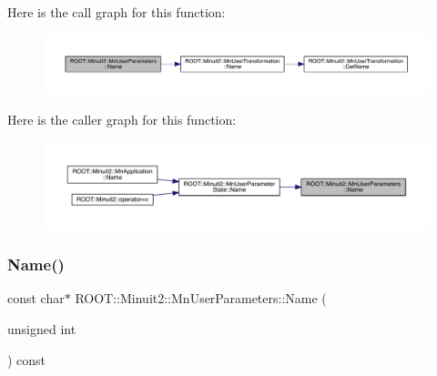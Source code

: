 Here is the call graph for this function\+:\nopagebreak
\begin{figure}[H]
\begin{center}
\leavevmode
\includegraphics[width=350pt]{d6/d10/classROOT_1_1Minuit2_1_1MnUserParameters_a1228bfaf2fd8b6f27ac5c302644e5120_cgraph}
\end{center}
\end{figure}
Here is the caller graph for this function\+:\nopagebreak
\begin{figure}[H]
\begin{center}
\leavevmode
\includegraphics[width=350pt]{d6/d10/classROOT_1_1Minuit2_1_1MnUserParameters_a1228bfaf2fd8b6f27ac5c302644e5120_icgraph}
\end{center}
\end{figure}
\mbox{\label{classROOT_1_1Minuit2_1_1MnUserParameters_a9606a3e37135ef1f08c2fe57036d07eb}} 
\subsubsection{\texorpdfstring{Name()}{Name()}\hspace{0.1cm}{\footnotesize\ttfamily [2/2]}}
{\footnotesize\ttfamily const char$\ast$ R\+O\+O\+T\+::\+Minuit2\+::\+Mn\+User\+Parameters\+::\+Name (\begin{DoxyParamCaption}\item[{unsigned int}]{ }\end{DoxyParamCaption}) const}

\mbox{\label{classROOT_1_1Minuit2_1_1MnUserParameters_a21d8a1f70098c2c9c82015cf0867c8ea}} 
